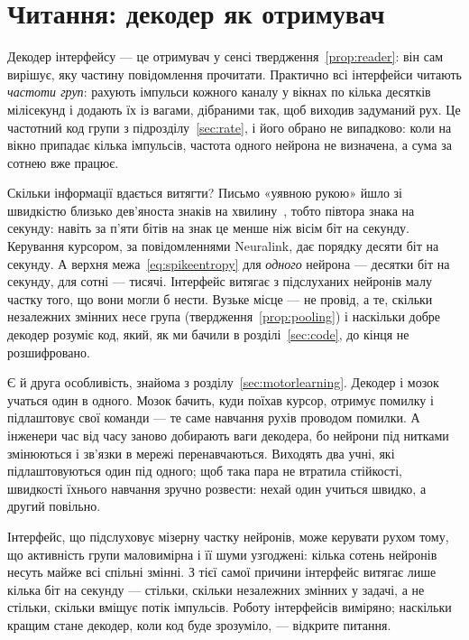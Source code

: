 \section{Читання: декодер як отримувач}

Декодер інтерфейсу --- це отримувач у сенсі твердження~\ref{prop:reader}: він сам вирішує, яку частину повідомлення прочитати. Практично всі інтерфейси читають \emph{частоти груп}: рахують імпульси кожного каналу у вікнах по кілька десятків мілісекунд і додають їх із вагами, дібраними так, щоб виходив задуманий рух. Це частотний код групи з підрозділу~\ref{sec:rate}, і його обрано не випадково: коли на вікно припадає кілька імпульсів, частота одного нейрона не визначена, а сума за сотнею вже працює.

Скільки інформації вдається витягти? Письмо «уявною рукою» йшло зі швидкістю близько дев'яноста знаків на хвилину~\cite{Willett2021}, тобто півтора знака на секунду: навіть за п'яти бітів на знак це менше ніж вісім біт на секунду. Керування курсором, за повідомленнями Neuralink, дає порядку десяти біт на секунду. А верхня межа~\eqref{eq:spikeentropy} для \emph{одного} нейрона --- десятки біт на секунду, для сотні --- тисячі. Інтерфейс витягає з підслуханих нейронів малу частку того, що вони могли б нести. Вузьке місце --- не провід, а те, скільки незалежних змінних несе група (твердження~\ref{prop:pooling}) і наскільки добре декодер розуміє код, який, як ми бачили в розділі~\ref{sec:code}, до кінця не розшифровано.

Є й друга особливість, знайома з розділу~\ref{sec:motorlearning}. Декодер і мозок учаться один в одного. Мозок бачить, куди поїхав курсор, отримує помилку і підлаштовує свої команди --- те саме навчання рухів проводом помилки. А інженери час від часу заново добирають ваги декодера, бо нейрони під нитками змінюються і зв'язки в мережі перенавчаються. Виходять два учні, які підлаштовуються один під одного; щоб така пара не втратила стійкості, швидкості їхнього навчання зручно розвести: нехай один учиться швидко, а другий повільно.

\begin{keyblock}
\begin{proposition}
\label{prop:probe}
Інтерфейс, що підслуховує мізерну частку нейронів, може керувати рухом тому, що активність групи маловимірна і її шуми узгоджені: кілька сотень нейронів несуть майже всі спільні змінні. З тієї самої причини інтерфейс витягає лише кілька біт на секунду --- стільки, скільки незалежних змінних у задачі, а не стільки, скільки вміщує потік імпульсів. Роботу інтерфейсів виміряно; наскільки кращим стане декодер, коли код буде зрозуміло, --- відкрите питання.
\end{proposition}
\end{keyblock}


